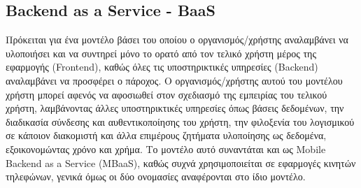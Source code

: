 \documentclass{article}
\begin{document}
\subsection {Backend as a Service - BaaS}
Πρόκειται για ένα μοντέλο βάσει του οποίου ο οργανισμός/χρήστης αναλαμβάνει να υλοποιήσει και να συντηρεί μόνο το ορατό από τον τελικό χρήστη μέρος της εφαρμογής (Frontend), καθώς όλες τις υποστηρικτικές υπηρεσίες (Backend) αναλαμβάνει να προσφέρει ο πάροχος. Ο οργανισμός/χρήστης αυτού του μοντέλου χρήστη μπορεί αφενός να αφοσιωθεί στον σχεδιασμό της εμπειρίας του τελικού χρήστη, λαμβάνοντας άλλες υποστηρικτικές υπηρεσίες όπως βάσεις δεδομένων, την διαδικασία σύνδεσης και αυθεντικοποίησης του χρήστη, την φιλοξενία του λογισμικού σε κάποιον διακομιστή και άλλα επιμέρους ζητήματα υλοποίησης ως δεδομένα, εξοικονομώντας χρόνο και χρήμα. Το μοντέλο αυτό συναντάται και ως Mobile Backend as a Service (MBaaS), καθώς συχνά χρησιμοποιείται σε εφαρμογές κινητών τηλεφώνων, γενικά όμως οι δύο ονομασίες αναφέρονται στο ίδιο μοντέλο.
\end{document}
